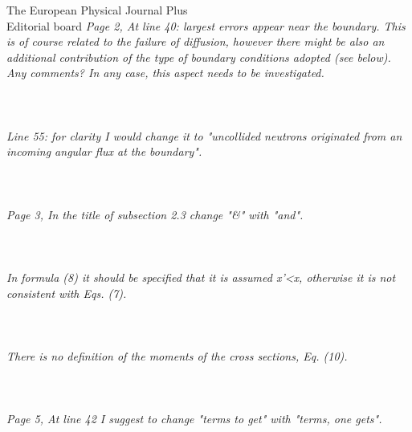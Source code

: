 \documentclass[11pt]{letter} %
\newcommand{\revised}[1]{{\color{red}{#1}}}
\begin{document}
\begin{letter}{The European Physical Journal Plus \\
Editorial board}
\textit{Page 2, At line 40: largest errors appear near the boundary. This is of course related to the failure of diffusion, however there might be also an additional contribution of the type of boundary conditions adopted (see below). Any comments? In any case, this aspect needs to be investigated.}
\\ \\
\revised{We agree with the reviewer that the effect of the definition of boundary conditions on the performances of the Ronen method should be further studied. This study will be conducted in the near future. As for the specific boundary conditions used in this paper, please see below.}
\\ \\
\textit{Line 55: for clarity I would change it to "uncollided neutrons originated from an incoming angular flux at the boundary".}
\\ \\
\revised{Fixed.}
\\ \\
\textit{Page 3, In the title of subsection 2.3 change "\&" with "and".}
\\ \\
\revised{Fixed.}
\\ \\
\textit{In formula (8) it should be specified that it is assumed x'<x, otherwise it is not consistent with Eqs. (7).}
\\ \\
\revised{Fixed.}
\\ \\
\textit{There is no definition of the moments of the cross sections, Eq. (10).}
\\ \\
\revised{Fixed.}
\\ \\
\textit{Page 5, At line 42 I suggest to change "terms to get" with "terms, one gets".}
\\ \\

\end{letter}
\end{document}
